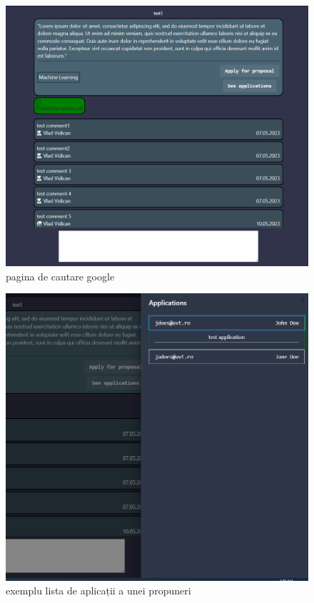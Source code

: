 \documentclass[12pt,a4paper,hidelinks]{report}
\theoremstyle{definition}
\theoremstyle{remark}
\begin{document}
\begin{figure}[H]
    \centering
    \includegraphics[scale=0.4]{images/ProposalPage.PNG}
    \caption{pagina de cautare google}
\end{figure}
\begin{figure}[H]
    \centering
    \includegraphics[scale=0.4]{images/Application.PNG}
    \caption{exemplu lista de aplicații a unei propuneri}
\end{figure}
\end{document}
